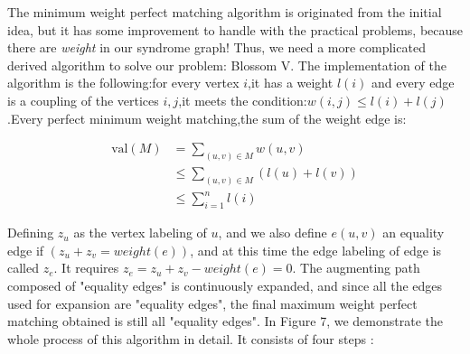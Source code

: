 \documentclass[
    a4paper, %
    10pt, %
    unnumberedsections, %
    twoside, %
]{LTJournalArticle}
\begin{document}
The minimum weight perfect matching algorithm is originated from the initial idea,
but it has some improvement to handle with the practical problems, because there are \emph{weight} in our syndrome graph!
Thus, we need a more complicated derived algorithm to solve our problem: Blossom V.
The implementation of the algorithm is the following:for every vertex $i$,it has a weight $l(i)$ and every edge is a coupling of the vertices $i,j$,it meets the condition:$w(i,j) \leq l(i)+l(j)$.Every perfect minimum weight matching,the sum of the weight edge is:
\begin{center}
\begin{align*}
    \text{val}(M) &= \sum_{(u,v)\in M}w(u,v) \\
    &\leq \sum_{(u,v)\in M}(l(u)+l(v)) \\
    &\leq \sum_{i=1}^{n}l(i)
\end{align*}
\end{center}
Defining $z_u$ as the vertex labeling of $u$, and we also define $e(u,v)$ an equality edge if $(z_u+z_v=weight(e))$, and at this time the edge labeling of edge is called $z_e$. It requires $z_e=z_u+z_v-weight(e)=0$.
The augmenting path composed of "equality edges" is continuously expanded, and since all the edges used for expansion are "equality edges", the final maximum weight perfect matching obtained is still all "equality edges".
In Figure 7, we demonstrate the whole process of this algorithm in detail. It consists of four steps \cite{10}:
\end{document}
